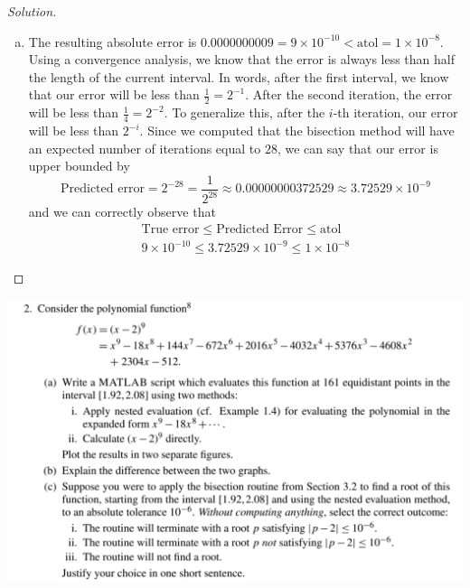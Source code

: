 \documentclass[12pt]{scrartcl}
\begin{document}
\begin{proof}[Solution]
\begin{enumerate}[(a)]
  \item The resulting absolute error is $0.0000000009 = 9 \times 10^{-10} < \text{atol} = 1 \times 10^{-8}$. Using a convergence analysis, we know that 
    the error is always less than half the length of the current interval. In words, after the first interval, 
    we know that our error will be less than $\frac{1}{2} = 2^{-1}$. After the second iteration, the error will be less than $\frac{1}{4} = 2^{-2}$. To generalize this, 
    after the $i$-th iteration, our error will be less than $2^{-i}$. Since we computed that the bisection method will have 
    an expected number of iterations equal to $28$, we can say that our error is upper bounded by 
    \[\text{Predicted error} = 2^{-28} = \frac{1}{2^{28}} \approx 0.00000000372529 \approx 3.72529 \times 10^{-9}\]
    and we can correctly observe that
    \begin{align*}
      \text{True error} \leq \text{Predicted Error} \leq \text{atol}\\
      9 \times 10^{-10} \leq 3.72529 \times 10^{-9} \leq 1 \times 10^{-8}
    \end{align*}

\end{enumerate}

\end{proof}

\newpage 

\includegraphics[width=14cm]{2.png}
\end{document}
